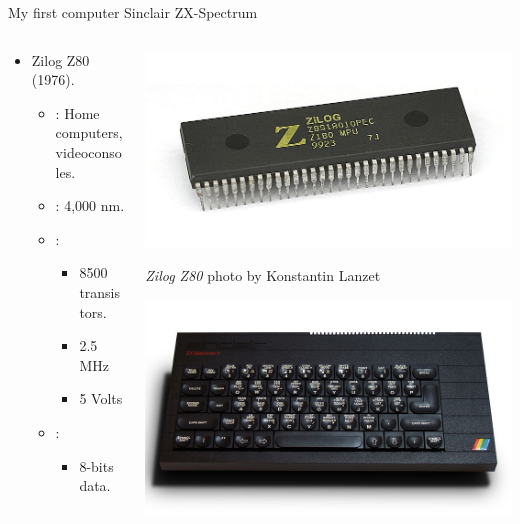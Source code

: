 \begin{frame}[t]{My first computer}
Sinclair ZX-Spectrum
\begin{columns}[T]
  \begin{column}{.7\textwidth}
    \begin{itemize}
      \item Zilog Z80 (1976).
        \begin{itemize}
          \item {}: Home computers, videoconsoles.
          \item {}: 4,000 nm.
          \vfill
          \item {}:
            \begin{itemize}
              \item 8500 transistors.
              \item 2.5 MHz
              \item 5 Volts
            \end{itemize}
          \vfill
          \item {}:
            \begin{itemize}
              \item 8-bits data.
            \end{itemize}
      \end{itemize}
    \end{itemize}
  \end{column}
  \begin{column}{.3\textwidth}
    \includegraphics[width=.8\textwidth]{images/z80-micro.jpg}\\
    \begin{tiny}
      \emph{Zilog Z80} photo by Konstantin Lanzet\\
    \end{tiny}
    \vspace{1em}
    \includegraphics[width=.8\textwidth]{images/zx-spectrum.jpg}\\

\end{column}
\end{columns}
\end{frame}
